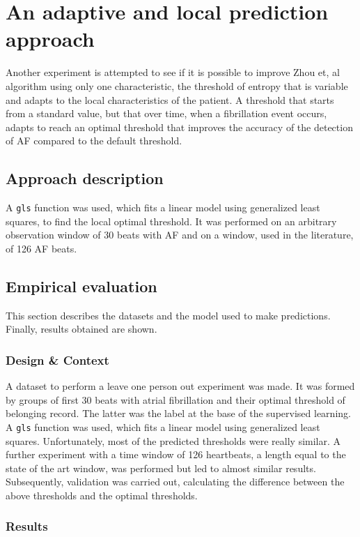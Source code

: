 \chapter{An adaptive and local prediction approach}
\label{sec:local}
Another experiment is attempted to see if it is possible to improve Zhou et, al algorithm using only one characteristic, the threshold of entropy that is variable and adapts to the local characteristics of the patient. A threshold that starts from a standard value, but that over time, when a fibrillation event occurs, adapts to reach an optimal threshold that improves the accuracy of the detection of AF compared to the default threshold.

\section{Approach description}
A \verb|gls| function was used, which fits a linear model using generalized least squares, to find the local optimal threshold. It was performed on an arbitrary observation window of 30 beats with AF and on a window, used in the literature, of 126 AF beats.

\section{Empirical evaluation}
This section describes the datasets and the model used to make predictions. Finally, results obtained are shown.

\subsection{Design \& Context}
A dataset to perform a leave one person out experiment was made. It was formed by groups of first $30$ beats with atrial fibrillation and their optimal threshold of belonging record. The latter was the label at the base of the supervised learning. A \verb|gls| function was used, which fits a linear model using generalized least squares. Unfortunately, most of the predicted thresholds were really similar. A further experiment with a time window of 126 heartbeats, a length equal to the state of the art window, was performed but led to almost similar results. Subsequently, validation was carried out, calculating the difference between the above thresholds and the optimal thresholds.

\subsection{Results}
